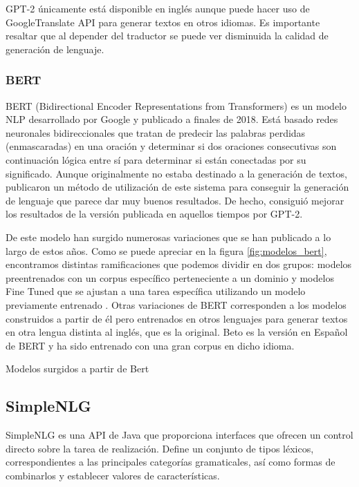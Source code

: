GPT-2 únicamente está disponible en inglés aunque puede hacer uso de GoogleTranslate API para generar textos en otros idiomas. Es importante resaltar que al depender del traductor se puede ver disminuida la calidad de generación de lenguaje.

\subsubsection{BERT}
BERT (Bidirectional Encoder Representations from Transformers) es un modelo NLP desarrollado por Google y publicado a finales de 2018. Está basado redes neuronales bidireccionales que tratan de predecir las palabras perdidas (enmascaradas) en una oración y determinar si dos oraciones consecutivas son continuación lógica entre sí para determinar si están conectadas por su significado. Aunque originalmente no estaba destinado a la generación de textos, \cite{wang-cho-2019-bert} publicaron un método de utilización de este sistema para conseguir la generación de lenguaje que parece dar muy buenos resultados. De hecho, consiguió mejorar los resultados de la versión publicada en aquellos tiempos por GPT-2. 

De este modelo han surgido numerosas variaciones que se han publicado a lo largo de estos años. Como se puede apreciar en la figura \ref{fig:modelos_bert}, encontramos distintas ramificaciones que podemos dividir en dos grupos: modelos preentrenados con un corpus específico perteneciente a un dominio y modelos Fine Tuned que se ajustan a una tarea específica utilizando un modelo previamente entrenado \citep{rajasekharan_2019}.
Otras variaciones de BERT corresponden a los modelos construidos a partir de él pero entrenados en otros lenguajes para generar textos en otra lengua distinta al inglés, que es la original. Beto es la versión en Español de BERT \citep{CaneteCFP2020} y ha sido entrenado con una gran corpus en dicho idioma.

%
{Modelos surgidos a partir de Bert}


\subsection{SimpleNLG}
SimpleNLG es una API de Java que proporciona interfaces que ofrecen un control directo sobre la tarea de realización. Define un conjunto de tipos léxicos, correspondientes a las principales categorías gramaticales, así como formas de combinarlos y establecer valores de características. 

